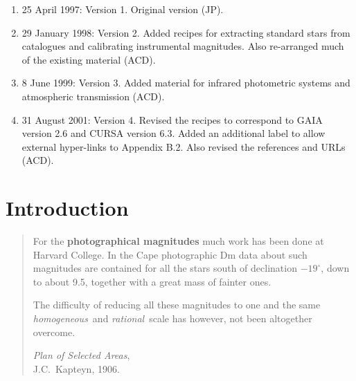 \documentclass[twoside,11pt,nolof]{starlink}
\begin{document}
\scfrontmatter


\begin{enumerate}

   \item 25 April 1997: Version 1. Original version (JP).

   \item 29 January 1998: Version 2.  Added recipes for extracting
    standard stars from catalogues and calibrating instrumental
    magnitudes.  Also re-arranged much of the existing material (ACD).

   \item 8 June 1999: Version 3.  Added material for infrared
    photometric systems and atmospheric transmission (ACD).

   \item 31 August 2001: Version 4.  Revised the recipes to correspond to
    GAIA version 2.6 and CURSA version 6.3.  Added an additional label to
    allow external hyper-links to Appendix B.2.  Also revised the references
    and URLs (ACD).

\end{enumerate}

\section{\label{INTRO}Introduction}

\begin{quote}
For the \textbf{photographical magnitudes} much work has been done at
Harvard College.  In the Cape photographic Dm data about such magnitudes
are contained for all the stars south of declination $-19^{\circ}$,
down to about 9.5, together with a great mass of fainter ones.

The difficulty of reducing all these magnitudes to one and the same
\textit{homogeneous}\, and \textit{rational}\, scale has however, not been
altogether overcome.

\textit{Plan of Selected Areas},    \raggedleft \\
J.C.~Kapteyn, 1906.              \raggedleft

\end{quote}
\end{document}
